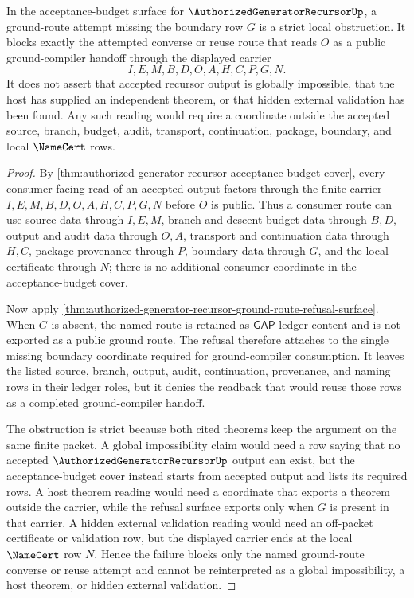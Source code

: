 \begin{corollary}
\label{cor:authorized-generator-recursor-acceptance-budget-strict-obstruction}
In the acceptance-budget surface for $\AuthorizedGeneratorRecursorUp$, a ground-route attempt missing the boundary row $G$ is a strict local obstruction. It blocks exactly the attempted converse or reuse route that reads $O$ as a public ground-compiler handoff through the displayed carrier
$$
I,E,M,B,D,O,A,H,C,P,G,N.
$$
It does not assert that accepted recursor output is globally impossible, that the host has supplied an independent theorem, or that hidden external validation has been found. Any such reading would require a coordinate outside the accepted source, branch, budget, audit, transport, continuation, package, boundary, and local $\NameCert$ rows.
\end{corollary}
\begin{proof}
By \autoref{thm:authorized-generator-recursor-acceptance-budget-cover}, every consumer-facing read of an accepted output factors through the finite carrier $I,E,M,B,D,O,A,H,C,P,G,N$ before $O$ is public. Thus a consumer route can use source data through $I,E,M$, branch and descent budget data through $B,D$, output and audit data through $O,A$, transport and continuation data through $H,C$, package provenance through $P$, boundary data through $G$, and the local certificate through $N$; there is no additional consumer coordinate in the acceptance-budget cover.

Now apply \autoref{thm:authorized-generator-recursor-ground-route-refusal-surface}. When $G$ is absent, the named route is retained as $\mathsf{GAP}$-ledger content and is not exported as a public ground route. The refusal therefore attaches to the single missing boundary coordinate required for ground-compiler consumption. It leaves the listed source, branch, output, audit, continuation, provenance, and naming rows in their ledger roles, but it denies the readback that would reuse those rows as a completed ground-compiler handoff.

The obstruction is strict because both cited theorems keep the argument on the same finite packet. A global impossibility claim would need a row saying that no accepted $\AuthorizedGeneratorRecursorUp$ output can exist, but the acceptance-budget cover instead starts from accepted output and lists its required rows. A host theorem reading would need a coordinate that exports a theorem outside the carrier, while the refusal surface exports only when $G$ is present in that carrier. A hidden external validation reading would need an off-packet certificate or validation row, but the displayed carrier ends at the local $\NameCert$ row $N$. Hence the failure blocks only the named ground-route converse or reuse attempt and cannot be reinterpreted as a global impossibility, a host theorem, or hidden external validation.
\end{proof}
